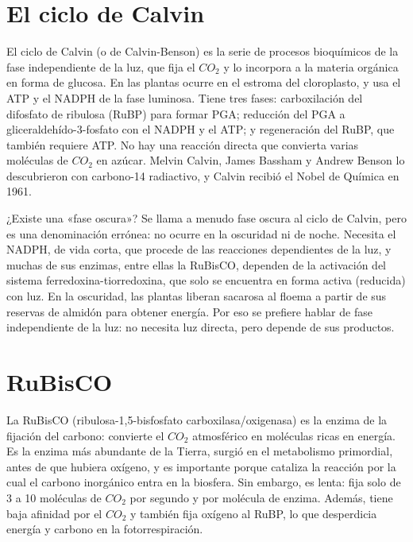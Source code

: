 \documentclass{book}
\begin{document}
\section{El ciclo de Calvin}

El ciclo de Calvin (o de Calvin-Benson) es la serie de procesos bioquímicos de la fase independiente de la luz, que fija el \(CO_{2}\) y lo incorpora a la materia orgánica en forma de glucosa. En las plantas ocurre en el estroma del cloroplasto, y usa el ATP y el NADPH de la fase luminosa. Tiene tres fases: carboxilación del difosfato de ribulosa (RuBP) para formar PGA; reducción del PGA a gliceraldehído-3-fosfato con el NADPH y el ATP; y regeneración del RuBP, que también requiere ATP. No hay una reacción directa que convierta varias moléculas de \(CO_{2}\) en azúcar. Melvin Calvin, James Bassham y Andrew Benson lo descubrieron con carbono-14 radiactivo, y Calvin recibió el Nobel de Química en 1961.


¿Existe una «fase oscura»?
Se llama a menudo fase oscura al ciclo de Calvin, pero es una denominación errónea: no ocurre en la oscuridad ni de noche. Necesita el NADPH, de vida corta, que procede de las reacciones dependientes de la luz, y muchas de sus enzimas, entre ellas la RuBisCO, dependen de la activación del sistema ferredoxina-tiorredoxina, que solo se encuentra en forma activa (reducida) con luz. En la oscuridad, las plantas liberan sacarosa al floema a partir de sus reservas de almidón para obtener energía. Por eso se prefiere hablar de fase independiente de la luz: no necesita luz directa, pero depende de sus productos.


\section{RuBisCO}

La RuBisCO (ribulosa-1,5-bisfosfato carboxilasa/oxigenasa) es la enzima de la fijación del carbono: convierte el \(CO_{2}\) atmosférico en moléculas ricas en energía. Es la enzima más abundante de la Tierra, surgió en el metabolismo primordial, antes de que hubiera oxígeno, y es importante porque cataliza la reacción por la cual el carbono inorgánico entra en la biosfera. Sin embargo, es lenta: fija solo de 3 a 10 moléculas de \(CO_{2}\) por segundo y por molécula de enzima. Además, tiene baja afinidad por el \(CO_{2}\) y también fija oxígeno al RuBP, lo que desperdicia energía y carbono en la fotorrespiración.
\end{document}
